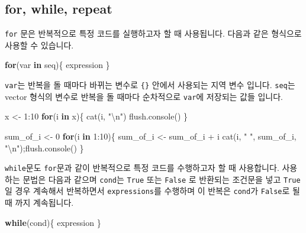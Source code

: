 \documentclass[
]{book}
\newenvironment{Shaded}{\begin{snugshade}}{\end{snugshade}}
\newcommand{\ControlFlowTok}[1]{\textcolor[rgb]{0.13,0.29,0.53}{\textbf{#1}}}
\newcommand{\DecValTok}[1]{\textcolor[rgb]{0.00,0.00,0.81}{#1}}
\newcommand{\FunctionTok}[1]{\textcolor[rgb]{0.00,0.00,0.00}{#1}}
\newcommand{\NormalTok}[1]{#1}
\newcommand{\OtherTok}[1]{\textcolor[rgb]{0.56,0.35,0.01}{#1}}
\newcommand{\SpecialCharTok}[1]{\textcolor[rgb]{0.00,0.00,0.00}{#1}}
\newcommand{\StringTok}[1]{\textcolor[rgb]{0.31,0.60,0.02}{#1}}
\begin{document}
\hypertarget{for-while-repeat}{%
\subsection{for, while, repeat}\label{for-while-repeat}}

\texttt{for} 문은 반복적으로 특정 코드를 실행하고자 할 때 사용됩니다. 다음과 같은 형식으로 사용할 수 있습니다.

\begin{Shaded}
\begin{Highlighting}[]
\ControlFlowTok{for}\NormalTok{(var }\ControlFlowTok{in}\NormalTok{ seq)\{}
\NormalTok{  expression}
\NormalTok{\}}
\end{Highlighting}
\end{Shaded}

\texttt{var}는 반복을 돌 때마다 바뀌는 변수로 \texttt{\{\}} 안에서 사용되는 지역 변수 입니다. \texttt{seq}는 vector 형식의 변수로 반복을 돌 때마다 순차적으로 \texttt{var}에 저장되는 값들 입니다.

\begin{Shaded}
\begin{Highlighting}[]
\NormalTok{x }\OtherTok{\textless{}{-}} \DecValTok{1}\SpecialCharTok{:}\DecValTok{10}
\ControlFlowTok{for}\NormalTok{(i }\ControlFlowTok{in}\NormalTok{ x)\{}
  \FunctionTok{cat}\NormalTok{(i, }\StringTok{"}\SpecialCharTok{\textbackslash{}n}\StringTok{"}\NormalTok{)}
  \FunctionTok{flush.console}\NormalTok{()}
\NormalTok{\}}

\NormalTok{sum\_of\_i }\OtherTok{\textless{}{-}} \DecValTok{0}
\ControlFlowTok{for}\NormalTok{(i }\ControlFlowTok{in} \DecValTok{1}\SpecialCharTok{:}\DecValTok{10}\NormalTok{)\{}
\NormalTok{  sum\_of\_i }\OtherTok{\textless{}{-}}\NormalTok{ sum\_of\_i }\SpecialCharTok{+}\NormalTok{ i}
  \FunctionTok{cat}\NormalTok{(i, }\StringTok{" "}\NormalTok{, sum\_of\_i, }\StringTok{"}\SpecialCharTok{\textbackslash{}n}\StringTok{"}\NormalTok{);}\FunctionTok{flush.console}\NormalTok{()}
\NormalTok{\}}
\end{Highlighting}
\end{Shaded}

\texttt{while}문도 \texttt{for}문과 같이 반복적으로 특정 코드를 수행하고자 할 때 사용합니다. 사용하는 문법은 다음과 같으며 \texttt{cond}는 \texttt{True} 또는 \texttt{False} 로 반환되는 조건문을 넣고 \texttt{True} 일 경우 계속해서 반복하면서 \texttt{expressions}를 수행하며 이 반복은 \texttt{cond}가 \texttt{False}로 될 때 까지 계속됩니다.

\begin{Shaded}
\begin{Highlighting}[]
\ControlFlowTok{while}\NormalTok{(cond)\{}
\NormalTok{  expression}
\NormalTok{\}}
\end{Highlighting}
\end{Shaded}
\end{document}
